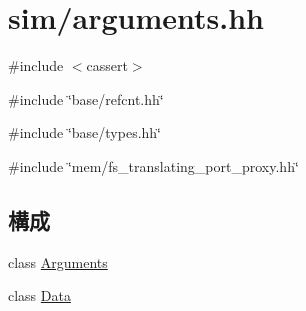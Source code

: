 \hypertarget{arguments_8hh}{
\section{sim/arguments.hh}
\label{arguments_8hh}
}
{\ttfamily \#include $<$cassert$>$}\par
{\ttfamily \#include \char`\"{}base/refcnt.hh\char`\"{}}\par
{\ttfamily \#include \char`\"{}base/types.hh\char`\"{}}\par
{\ttfamily \#include \char`\"{}mem/fs\_\-translating\_\-port\_\-proxy.hh\char`\"{}}\par
\subsection*{構成}
\begin{DoxyCompactItemize}
\item 
class \hyperlink{classArguments}{Arguments}
\item 
class \hyperlink{classArguments_1_1Data}{Data}
\end{DoxyCompactItemize}
